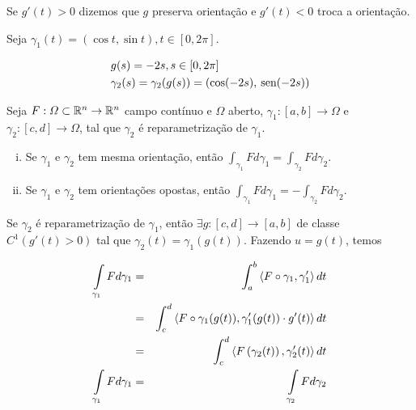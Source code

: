 \documentclass{book}
\begin{document}
Se $g'(t) > 0$ dizemos que $g$ preserva orienta\c c\~ao e $g'(t) < 0$ troca a orienta\c c\~ao.

\begin{ex}
Seja $\gamma_1 (t) = (\cos t, \sin t), t \in [0,2\pi]$.

\[
\begin{gathered}
  g(s) =  - 2s,s \in [0,2\pi ] \hfill \\
  \gamma _2 (s) = \gamma _2 (g(s)) = \left( {\cos ( - 2s),\sin ( - 2s)} \right) \hfill \\ 
\end{gathered} 
\]
\end{ex}

\begin{teo}
Seja $F:\varOmega \subset \mathbb{R}^n \to \mathbb{R}^n$ campo cont\'inuo e $\varOmega$ aberto, $\gamma_1: [a,b] \to \varOmega$ e $\gamma_2: [c,d] \to \varOmega$, tal que $\gamma_2$ \'e reparametriza\c c\~ao de $\gamma_1$.

\begin{enumerate}[(i)]
 \item Se $\gamma_1$ e $\gamma_2$ tem mesma orienta\c c\~ao, ent\~ao $\int_{\gamma _1 } {Fd\gamma _1 }  = \int_{\gamma _2 } {Fd\gamma _2 }$.
 \item Se $\gamma_1$ e $\gamma_2$ tem orienta\c c\~oes opostas, ent\~ao $\int_{\gamma _1 } {Fd\gamma _1 }  = -\int_{\gamma _2 } {Fd\gamma _2 }$.
\end{enumerate}

\end{teo}

\begin{dem}
Se $\gamma_2$ \'e reparametriza\c c\~ao de $\gamma_1$, ent\~ao $\exists g: [c,d] \to [a,b]$ de classe $C^1 (g'(t) > 0)$ tal que $\gamma_2 (t) = \gamma_1 (g(t))$. Fazendo $u = g(t)$, temos

\begin{eqnarray*}
\int\limits_{\gamma _1 } {Fd\gamma _1 } &=& \int_a^b {\left\langle {F \circ \gamma _1 ,\gamma _1 '} \right\rangle dt}  \hfill \\
&=& \int_c^d {\left\langle {F \circ \gamma _1 (g(t)),\gamma _1 '(g(t)) \cdot g'(t)} \right\rangle dt}  \hfill \\
&=& \int_c^d {\left\langle {F\left( {\gamma _2 (t)} \right),\gamma _2 '(t)} \right\rangle dt}  \hfill \\
\int\limits_{\gamma _1 } {Fd\gamma _1 } &=& \int\limits_{\gamma _2 } {Fd\gamma _2 }  \hfill \\ 
\end{eqnarray*}

\end{dem}
\end{document}
